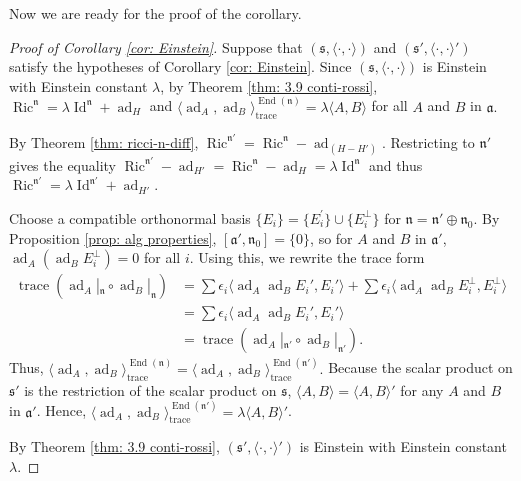 \documentclass[12pt]{amsart}
\newcommand{\la}{\langle}
\newcommand{\ra}{\rangle}
\newcommand{\trace}{\operatorname{trace}}
\newcommand{\Id}{\operatorname{Id}}
\newcommand{\fraka}{\ensuremath{\mathfrak{a}} }
\newcommand{\frakn}{\ensuremath{\mathfrak{n}} }
\newcommand{\fraks}{\ensuremath{\mathfrak{s}} }
\newcommand\ip{{\langle\cdot {,} \cdot\rangle}}
\newcommand\ad{\operatorname{ad}}
\newcommand\End{\operatorname{End}}
\newcommand{\Ric}{\operatorname{Ric}}
\theoremstyle{plain}
\theoremstyle{definition}
\theoremstyle{remark}
\numberwithin{equation}{section}
\numberwithin{theorem}{section}
\begin{document}
Now we are ready for the proof of the corollary. 
\begin{proof}[Proof of Corollary \ref{cor: Einstein}] Suppose that $(\fraks,\ip)$ and  $(\fraks', \ip')$ satisfy the hypotheses of Corollary \ref{cor: Einstein}.
Since $(\fraks,\ip)$ is Einstein with Einstein constant $\lambda$,  by Theorem \ref{thm: 3.9 conti-rossi},  $\Ric^{\frakn} = \lambda \Id^{\frakn} + \ad_H$  and
  $\la \ad_A, \ad_B \ra_{\trace}^{\End(\frakn)} = \lambda \la A, B \ra$ for all $A$ and $B$ in $\fraka.$

By Theorem \ref{thm: ricci-n-diff}, $\Ric^{\frakn'}= 
 \Ric^\frakn - \ad_{(H-H')}.$ 
Restricting to $\frakn'$ gives the equality  
$\Ric^{\frakn'} - \ad_{H'} =\Ric^\frakn - \ad_H = \lambda\Id^{\frakn}$
and thus 
$\Ric^{\frakn'} =  \lambda\Id^{\frakn'} + \ad_{H'}$.
  
  Choose a compatible orthonormal basis $\{E_i\} = \{E_i^\prime\} \cup \{E_i^\perp\}  $ for $\frakn = \frakn' \oplus \frakn_0.$
  By Proposition \ref{prop: alg properties}, $[\fraka', \frakn_0] = \{0\} $, so for $A$ and $B$ in $\fraka'$, 
  $\ad_A (\ad_B E_i^\perp) = 0$ for all $i.$
Using this, we rewrite the trace form
  \begin{align*}
   \trace(\ad_A|_{\frakn} \circ \ad_B|_{\frakn})
   &= \sum \epsilon_i \la \ad_A  \ad_B E_i', E_i' \ra  + \sum \epsilon_i \la \ad_A  \ad_B E_i^\perp, 
   E_i^\perp \ra \\
   &=  \sum \epsilon_i \la \ad_A  \ad_B E_i', E_i' \ra \\
   &=
  \trace(\ad_A|_{\frakn'} \circ \ad_B|_{\frakn'}). 
\end{align*}
 Thus, 
 $ \la \ad_A, \ad_B \ra_{\trace}^{\End(\frakn)} =  \la \ad_A, \ad_B \ra_{\trace}^{\End(\frakn')}.$
Because the scalar product on $\fraks'$ is the restriction of the scalar product on $\fraks$, $\la A, B\ra =
\la A, B\ra'$ for any $A$ and $B$ in $\fraka'$.  Hence,  $ \la \ad_A, \ad_B \ra_{\trace}^{\End(\frakn')} = \lambda\la A,B \ra' $.

By  Theorem \ref{thm: 3.9 conti-rossi},  $(\fraks', \ip')$ is Einstein with Einstein constant  $\lambda$.
\end{proof}
\end{document}
